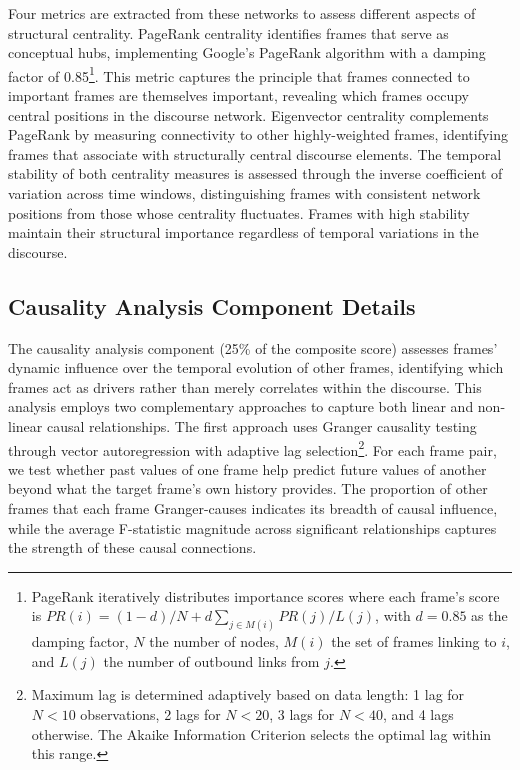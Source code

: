 \documentclass[12pt]{article}
\begin{document}
Four metrics are extracted from these networks to assess different aspects of structural centrality. PageRank centrality identifies frames that serve as conceptual hubs, implementing Google's PageRank algorithm with a damping factor of 0.85\footnote{PageRank iteratively distributes importance scores where each frame's score is $PR(i) = (1-d)/N + d \sum_{j \in M(i)} PR(j)/L(j)$, with $d=0.85$ as the damping factor, $N$ the number of nodes, $M(i)$ the set of frames linking to $i$, and $L(j)$ the number of outbound links from $j$.}. This metric captures the principle that frames connected to important frames are themselves important, revealing which frames occupy central positions in the discourse network. Eigenvector centrality complements PageRank by measuring connectivity to other highly-weighted frames, identifying frames that associate with structurally central discourse elements. The temporal stability of both centrality measures is assessed through the inverse coefficient of variation across time windows, distinguishing frames with consistent network positions from those whose centrality fluctuates. Frames with high stability maintain their structural importance regardless of temporal variations in the discourse.

\subsection{Causality Analysis Component Details}

The causality analysis component (25\% of the composite score) assesses frames' dynamic influence over the temporal evolution of other frames, identifying which frames act as drivers rather than merely correlates within the discourse. This analysis employs two complementary approaches to capture both linear and non-linear causal relationships. The first approach uses Granger causality testing through vector autoregression with adaptive lag selection\footnote{Maximum lag is determined adaptively based on data length: 1 lag for $N<10$ observations, 2 lags for $N<20$, 3 lags for $N<40$, and 4 lags otherwise. The Akaike Information Criterion selects the optimal lag within this range.}. For each frame pair, we test whether past values of one frame help predict future values of another beyond what the target frame's own history provides. The proportion of other frames that each frame Granger-causes indicates its breadth of causal influence, while the average F-statistic magnitude across significant relationships captures the strength of these causal connections.
\end{document}
